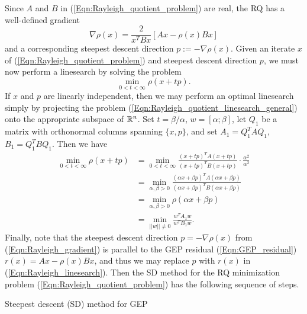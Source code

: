 \begin{enumerate}
Since $A$ and $B$ in (\ref{Eqn:Rayleigh_quotient_problem}) are real, the RQ has a well-defined gradient
\begin{equation}			\label{Eqn:Rayleigh_gradient}
\nabla \rho(x) = \frac{2}{x^TBx} \left[ Ax - \rho(x)Bx \right]
\end{equation}
and a corresponding steepest descent direction $p := -\nabla \rho(x)$.  Given an iterate $x$ of (\ref{Eqn:Rayleigh_quotient_problem}) and steepest descent direction $p$, we must now perform a linesearch by solving the problem
\begin{equation} 			\label{Eqn:Rayleigh_quotient_linesearch_general}
\min\limits_{0 < t < \infty} \rho(x+tp).
\end{equation}
If $x$ and $p$ are linearly independent, then we may perform an optimal linesearch simply by projecting the problem (\ref{Eqn:Rayleigh_quotient_linesearch_general}) onto the appropriate subspace of ${\mathbb R}^n$.  Set $t = \beta/\alpha$, $w = [\alpha; \beta]$, let $Q_1$ be a matrix with orthonormal columns spanning $\{x, p\}$, and set $A_1 = Q_1^TAQ_1$, $B_1 = Q_1^TBQ_1$.  Then we have
\begin{equation} 			\label{Eqn:Rayleigh_linesearch}
\begin{split}
\min\limits_{0 < t < \infty} \rho(x+tp)
	&	 = 			\min\limits_{0 < t < \infty}	\frac{(x+tp)^TA(x+tp)}{(x+tp)^TB(x+tp)}\cdot\frac{\alpha^2}{\alpha^2}\\
	&	 = 		\min\limits_{\alpha, \beta > 0}	\frac{(\alpha x+ \beta p)^TA(\alpha x+\beta p)}{(\alpha x+ \beta p)^TB(\alpha x+ \beta p)} \\
	&	 = 		\min\limits_{\alpha, \beta > 0}		\rho(\alpha x + \beta p)	\\
	&	 = 			\min\limits_{||w|| \neq 0} \frac{w^TA_1w}{w^TB_1w}.
\end{split}
\end{equation}
Finally, note that the steepest descent direction $p = - \nabla \rho(x)$ from (\ref{Eqn:Rayleigh_gradient}) is parallel to the GEP residual (\ref{Eqn:GEP_residual}) $r(x) = Ax - \rho(x)Bx$, and thus we may replace $p$ with $r(x)$ in (\ref{Eqn:Rayleigh_linesearch}).   Then the SD method for the RQ minimization problem (\ref{Eqn:Rayleigh_quotient_problem}) has the following sequence of steps.




\begin{algorithm}[H]
\caption{Steepest descent (SD) method for GEP}	\label{Alg:SD}


\end{algorithm}
\end{enumerate}
